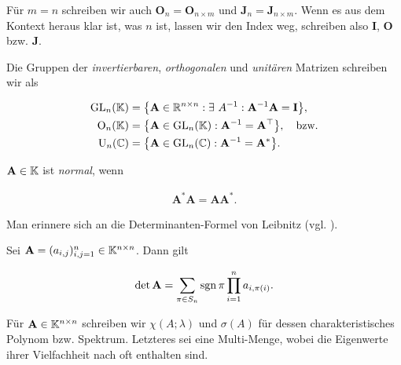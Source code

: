             Für $m = n$ schreiben wir auch $\mathbf O_n = \mathbf O_{n \times m}$ und $\mathbf J_n = \mathbf J_{n \times m}$.
            Wenn es aus dem Kontext heraus klar ist, was $n$ ist, lassen wir den Index weg, schreiben also $\mathbf I$, $\mathbf O$ bzw. $\mathbf J$.

            Die Gruppen der \textit{invertierbaren}, \textit{orthogonalen} und \textit{unitären} Matrizen schreiben wir als

            \begin{align*}
                \operatorname{GL}_n(\mathbb K) & = {\left \{ \mathbf A \in \mathbb R^{n \times n}: \exists ~ A^{-1}: \mathbf A^{-1} \mathbf A = \mathbf I \right \}}, \\
                \operatorname O_n(\mathbb K)   & = {\left \{ \mathbf A \in \operatorname{GL}_n(\mathbb K): \mathbf A^{-1} = \mathbf A^\top \right \}},
                \quad
                \text{bzw.} \\
                \operatorname U_n(\mathbb C)   & = {\left \{ \mathbf A \in \operatorname{GL}_n(\mathbb C): \mathbf A^{-1} = \mathbf A^\ast \right \}}.
            \end{align*}

            $\mathbf A \in \mathbb K$ ist \textit{normal}, wenn

            \begin{align*}
                \mathbf A^\ast \mathbf A
                =
                \mathbf A \mathbf A^\ast.
            \end{align*}

            Man erinnere sich an die Determinanten-Formel von Leibnitz (vgl. \cite[Kapitel 7.1]{LinAG1&2}).

            \begin{lemma} \label{lem:leibnitz}

                Sei $\mathbf A = (a_{i,j})_{i,j=1}^n \in \mathbb K^{n \times n}$.
                Dann gilt

                \begin{align*}
                    \det \mathbf A
                    =
                    \sum_{\pi \in S_n}
                        \operatorname{sgn} \pi
                        \prod_{i=1}^n
                            a_{i, \pi(i)}.
                \end{align*}

            \end{lemma}

            Für $\mathbf A \in \mathbb K^{n \times n}$ schreiben wir $\chi(A; \lambda)$ und $\sigma(A)$ für dessen charakteristisches Polynom bzw. Spektrum.
            Letzteres sei eine Multi-Menge, wobei die Eigenwerte ihrer Vielfachheit nach oft enthalten sind.

